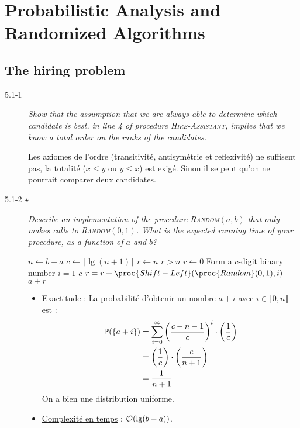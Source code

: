 \section{Probabilistic Analysis and Randomized Algorithms}

\subsection{The hiring problem}

\begin{description}
  \item[5.1-1] {\itshape Show that the assumption that we are always able to determine which candidate is best, in line 4 of procedure {\scshape Hire-Assistant}, implies that we know a total order on the ranks of the candidates.}
    \begin{ex}
      Les axiomes de l'ordre (transitivit\'e, antisym\'etrie et reflexivit\'e) ne suffisent pas, la totalit\'e ($x \le y$ ou $y \le x$) est exig\'e. Sinon il se peut qu'on ne pourrait comparer deux candidates. 
    \end{ex}

  \item[5.1-2 $\star$] {\itshape Describe an implementation of the procedure {\scshape Random}$(a, b)$ that only makes calls to {\scshape Random}$(0, 1)$. What is the expected running time of your procedure, as a function of $a$ and $b$?}
    \begin{ex}
      \begin{codebox} %
        \li $ n \gets b - a$
        \li $ c \gets \lceil \lg (n+1) \rceil$
        \li $ r \gets n$
        \li \While $r > n$ \Do
        \li $ r \gets 0$
        \li \Comment Form a $c$-digit binary number 
        \li \For $i = 1$ \To $c$ \Do
        \li $r = r + \proc{Shift-Left}(\proc{Random}(0,1),i)$ \End \End
        \li \Return $a + r$
      \end{codebox}

    \begin{itemize}
      \item \ul{Exactitude} : La probabilit\'e d'obtenir un nombre $a + i$ avec $i \in \llbracket 0, n \rrbracket$ est :
        \begin{align*}
          \P(\left\{ a+i \right\}) &=  \sum_{i=0}^{\infty}\left( \frac{c-n-1}{c} \right)^i\cdot\left( \frac{1}{c} \right)\\
          &= \left( \frac{1}{c} \right)\cdot\left( \frac{c}{n+1} \right)\\
          &= \frac{1}{n+1}
        \end{align*}
        On a bien une distribution uniforme.
      \item \ul{Complexit\'e en temps} : $\O (\lg (b-a))$. %
    \end{itemize}


\end{ex}
\end{description}
